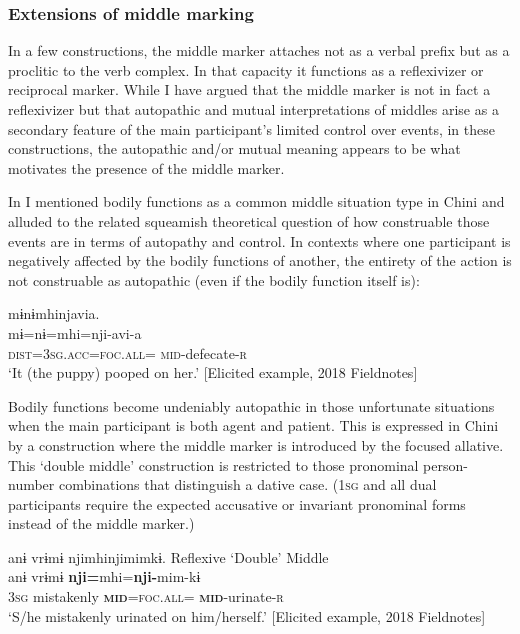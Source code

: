\documentclass[output=paper]{langscibook}
\begin{document}
\subsubsection{{Extensions} {of} {middle} {marking}}\label{sec:brooks:4.2.2}

In a few constructions, the middle marker attaches not as a verbal prefix but as a proclitic to the verb complex. In that capacity it functions as a reflexivizer or reciprocal marker. While I have argued that the middle marker is not in fact a reflexivizer but that autopathic and mutual interpretations of middles arise as a secondary feature of the main participant’s limited control over events, in these constructions, the autopathic and/or mutual meaning appears to be what motivates the presence of the middle marker.

In  I mentioned bodily functions as a common middle situation type in Chini and alluded to the related squeamish theoretical question of how construable those events are in terms of autopathy and control. In contexts where one participant is negatively affected by the bodily functions of another, the entirety of the action is not construable as autopathic (even if the bodily function itself is):

\ea\label{ex:brooks:34}
\glll mɨnɨmhinjavia.\\
 mɨ=nɨ=mhi=nji-avi-a\\
\textsc{dist=3sg.acc=foc.all=} \textsc{mid}-defecate-\textsc{r}\\
\glt `It (the puppy) pooped on her.' [Elicited example, 2018 Fieldnotes]
\z

Bodily functions become undeniably autopathic in those unfortunate situations when the main participant is both agent and patient. This is expressed in Chini by a construction where the middle marker is introduced by the focused allative. This ‘double middle’ construction is restricted to those pronominal person-number combinations that distinguish a dative case. (1\textsc{sg} and all dual participants require the expected accusative or invariant pronominal forms instead of the middle marker.)

\ea\label{ex:brooks:35}
\glll anɨ  vrɨmɨ   {nji}mhi{nji}mimkɨ.  \textup{Reflexive ‘Double’ Middle}\\
anɨ  vrɨmɨ   \textbf{nji=}mhi=\textbf{nji-}mim-kɨ\\
\textsc{3sg}  mistakenly  \textbf{\textsc{mid}}\textsc{=foc.all=} \textbf{\textsc{mid}}\textsc{-}urinate\textsc{-r}\\
\glt `S/he mistakenly urinated on him/herself.' [Elicited example, 2018 Fieldnotes]
\z
\end{document}
